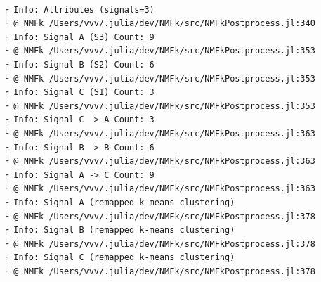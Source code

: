 \documentclass[11pt]{article}
\begin{document}
    \begin{center}
    \end{center}
    { \hspace*{\fill} \\}

    \begin{Verbatim}[commandchars=\\\{\}]

    \end{Verbatim}

    \begin{Verbatim}[commandchars=\\\{\}]
┌ Info: Attributes (signals=3)
└ @ NMFk /Users/vvv/.julia/dev/NMFk/src/NMFkPostprocess.jl:340
┌ Info: Signal A (S3) Count: 9
└ @ NMFk /Users/vvv/.julia/dev/NMFk/src/NMFkPostprocess.jl:353
┌ Info: Signal B (S2) Count: 6
└ @ NMFk /Users/vvv/.julia/dev/NMFk/src/NMFkPostprocess.jl:353
┌ Info: Signal C (S1) Count: 3
└ @ NMFk /Users/vvv/.julia/dev/NMFk/src/NMFkPostprocess.jl:353
┌ Info: Signal C -> A Count: 3
└ @ NMFk /Users/vvv/.julia/dev/NMFk/src/NMFkPostprocess.jl:363
┌ Info: Signal B -> B Count: 6
└ @ NMFk /Users/vvv/.julia/dev/NMFk/src/NMFkPostprocess.jl:363
┌ Info: Signal A -> C Count: 9
└ @ NMFk /Users/vvv/.julia/dev/NMFk/src/NMFkPostprocess.jl:363
┌ Info: Signal A (remapped k-means clustering)
└ @ NMFk /Users/vvv/.julia/dev/NMFk/src/NMFkPostprocess.jl:378
┌ Info: Signal B (remapped k-means clustering)
└ @ NMFk /Users/vvv/.julia/dev/NMFk/src/NMFkPostprocess.jl:378
┌ Info: Signal C (remapped k-means clustering)
└ @ NMFk /Users/vvv/.julia/dev/NMFk/src/NMFkPostprocess.jl:378
    \end{Verbatim}

    \begin{center}
    \end{center}
    { \hspace*{\fill} \\}

    \begin{Verbatim}[commandchars=\\\{\}]

    \end{Verbatim}

    \begin{center}
    \end{center}
    { \hspace*{\fill} \\}
\end{document}
